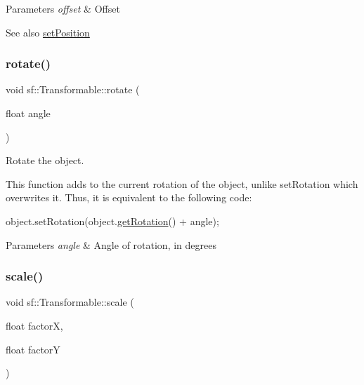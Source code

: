 \begin{DoxyParams}{Parameters}
{\em offset} & Offset\\
\hline
\end{DoxyParams}
\begin{DoxySeeAlso}{See also}
\hyperlink{classsf_1_1_transformable_a4dbfb1a7c80688b0b4c477d706550208}{set\+Position} 
\end{DoxySeeAlso}
\mbox{\label{classsf_1_1_transformable_af8a5ffddc0d93f238fee3bf8efe1ebda}} 
\subsubsection{\texorpdfstring{rotate()}{rotate()}}
{\footnotesize\ttfamily void sf\+::\+Transformable\+::rotate (\begin{DoxyParamCaption}\item[{float}]{angle }\end{DoxyParamCaption})}



Rotate the object. 

This function adds to the current rotation of the object, unlike set\+Rotation which overwrites it. Thus, it is equivalent to the following code\+: 
\begin{DoxyCode}
\textcolor{keywordtype}{object}.setRotation(\textcolor{keywordtype}{object}.\hyperlink{classsf_1_1_transformable_aa00b5c5d4a06ac24a94dd72c56931d3a}{getRotation}() + angle);
\end{DoxyCode}



\begin{DoxyParams}{Parameters}
{\em angle} & Angle of rotation, in degrees \\
\hline
\end{DoxyParams}
\mbox{\label{classsf_1_1_transformable_a3de0c6d8957f3cf318092f3f60656391}} 
\subsubsection{\texorpdfstring{scale()}{scale()}\hspace{0.1cm}{\footnotesize\ttfamily [1/2]}}
{\footnotesize\ttfamily void sf\+::\+Transformable\+::scale (\begin{DoxyParamCaption}\item[{float}]{factorX,  }\item[{float}]{factorY }\end{DoxyParamCaption})}



